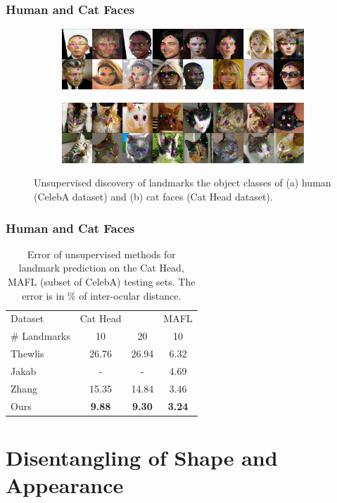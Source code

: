 	\begin{frame}
	\frametitle{Human and Cat Faces}
		\begin{figure}[htp]
			\centering
			\begin{subfigure}{1.\textwidth}
			\includegraphics[trim={0cm 0cm 0cm 0cm},clip, width=1.\linewidth]{fig/shape/0celeba}\caption{}
			\end{subfigure}
			\begin{subfigure}{1.\textwidth}
			\includegraphics[trim={0cm 0cm 0cm 0cm},clip, width=1.\linewidth]{fig/shape/0cats}\caption{}
			\end{subfigure}
			\caption{{Unsupervised discovery of landmarks the object classes of (a) human (CelebA dataset) and (b) cat faces (Cat Head dataset).}}
			\label{fig:kp_faces}
		\end{figure}
	\end{frame}

	\begin{frame}
	\frametitle{Human and Cat Faces}
		\begin{table}[t]
				\caption{Error of unsupervised methods for landmark prediction on the Cat Head, MAFL (subset of CelebA) testing sets. The error is in \% of inter-ocular distance.}
				\label{tab:faces}
				\centering
				\begin{tabular}{l|ccc}
				\hline
				Dataset & Cat Head &  & MAFL \\
				  \# Landmarks &10 & 20  & 10  \\
				  \hline
				 Thewlis \cite{thewlis17}
				 & 26.76 & 26.94 & 6.32    \\
				 Jakab \cite{jakab18}
				 & - & - & 4.69  \\
				 Zhang \cite{zhang18}
				 & 15.35 & 14.84 & 3.46  \\
				  Ours & \textbf{9.88}  & \textbf{9.30} & \textbf{3.24}  \\ \hline  %
				\end{tabular}
		\end{table}
	\end{frame}






\section{Disentangling of Shape and Appearance}



